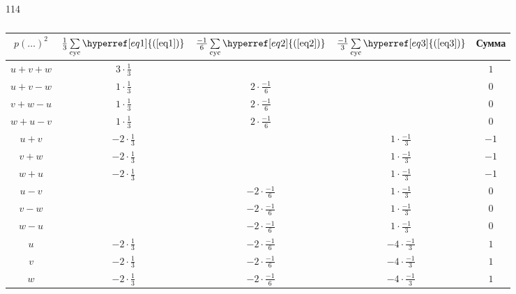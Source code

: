 \documentclass[12pt,a4paper]{article}
\begin{document}
\begin{problem}{114}
\begin{enumerate}
                \begin{table}
                    \centering
                    \begin{tabular}{c||c|c|c||c}
                        $p(\ldots)^2$&
                        $\frac{1}{3} \sum\limits_{\mathrm{cyc}} \hyperref[eq1]{(\ref*{eq1})}$&
                        $\frac{-1}{6} \sum\limits_{\mathrm{cyc}} \hyperref[eq2]{(\ref*{eq2})}$&
                        $\frac{-1}{3} \sum\limits_{\mathrm{cyc}} \hyperref[eq3]{(\ref*{eq3})}$&
                        Сумма\\
                        \hline
                        \raisebox{-10pt}{\rule{0pt}{28pt}} $u + v + w$& $3 \cdot \frac{1}{3}$& & & $1$\\
                        \raisebox{-10pt}{\rule{0pt}{28pt}} $u + v - w$& $1 \cdot \frac{1}{3}$& $2 \cdot \frac{-1}{6}$& & $0$\\
                        \raisebox{-10pt}{\rule{0pt}{28pt}} $v + w - u$& $1 \cdot \frac{1}{3}$& $2 \cdot \frac{-1}{6}$& & $0$\\
                        \raisebox{-10pt}{\rule{0pt}{28pt}} $w + u - v$& $1 \cdot \frac{1}{3}$& $2 \cdot \frac{-1}{6}$& & $0$\\
                        \raisebox{-10pt}{\rule{0pt}{28pt}} $u + v$& $-2 \cdot \frac{1}{3}$& & $1 \cdot \frac{-1}{3}$& $-1$\\
                        \raisebox{-10pt}{\rule{0pt}{28pt}} $v + w$& $-2 \cdot \frac{1}{3}$& & $1 \cdot \frac{-1}{3}$& $-1$\\
                        \raisebox{-10pt}{\rule{0pt}{28pt}} $w + u$& $-2 \cdot \frac{1}{3}$& & $1 \cdot \frac{-1}{3}$& $-1$\\
                        \raisebox{-10pt}{\rule{0pt}{28pt}} $u - v$& & $-2 \cdot \frac{-1}{6}$& $1 \cdot \frac{-1}{3}$& $0$\\
                        \raisebox{-10pt}{\rule{0pt}{28pt}} $v - w$& & $-2 \cdot \frac{-1}{6}$& $1 \cdot \frac{-1}{3}$& $0$\\
                        \raisebox{-10pt}{\rule{0pt}{28pt}} $w - u$& & $-2 \cdot \frac{-1}{6}$& $1 \cdot \frac{-1}{3}$& $0$\\
                        \raisebox{-10pt}{\rule{0pt}{28pt}} $u$& $-2 \cdot \frac{1}{3}$& $-2 \cdot \frac{-1}{6}$& $-4 \cdot \frac{-1}{3}$& $1$\\
                        \raisebox{-10pt}{\rule{0pt}{28pt}} $v$& $-2 \cdot \frac{1}{3}$& $-2 \cdot \frac{-1}{6}$& $-4 \cdot \frac{-1}{3}$& $1$\\
                        \raisebox{-10pt}{\rule{0pt}{28pt}} $w$& $-2 \cdot \frac{1}{3}$& $-2 \cdot \frac{-1}{6}$& $-4 \cdot \frac{-1}{3}$& $1$\\
                    \end{tabular}
                    \caption{}\label{result-table}
                \end{table}


\end{enumerate}
\end{problem}
\end{document}
